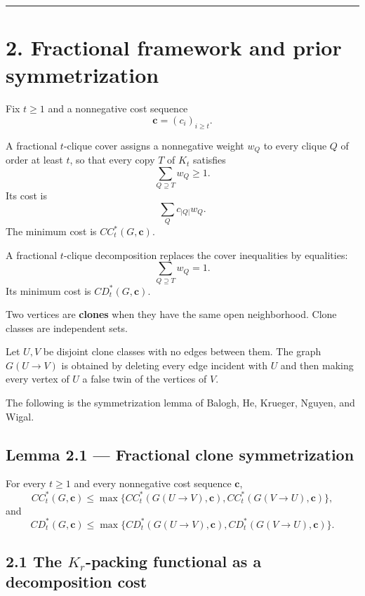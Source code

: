 \documentclass[11pt,a4paper]{article}
\begin{document}
\begin{center}\rule{0.5\linewidth}{0.5pt}\end{center}

\section{2. Fractional framework and prior symmetrization}\label{fractional-framework-and-prior-symmetrization}

Fix \(t\ge1\) and a nonnegative cost sequence
\[
\mathbf c=(c_i)_{i\ge t}.
\]

A fractional \(t\)-clique cover assigns a nonnegative weight \(w_Q\) to
every clique \(Q\) of order at least \(t\), so that every copy \(T\) of
\(K_t\) satisfies
\[
\sum_{Q\supseteq T}w_Q\ge1.
\]
Its cost is
\[
\sum_Qc_{|Q|}w_Q.
\]
The minimum cost is \(CC_t^*(G,\mathbf c)\).

A fractional \(t\)-clique decomposition replaces the cover inequalities by
equalities:
\[
\sum_{Q\supseteq T}w_Q=1.
\]
Its minimum cost is \(CD_t^*(G,\mathbf c)\).

Two vertices are \textbf{clones} when they have the same open neighborhood. Clone
classes are independent sets.

Let \(U,V\) be disjoint clone classes with no edges between them.
The graph \(G(U\to V)\) is obtained by deleting every edge incident with
\(U\) and then making every vertex of \(U\) a false twin of the vertices of
\(V\).

The following is the symmetrization lemma of Balogh, He, Krueger, Nguyen,
and Wigal.

\subsection{Lemma 2.1 --- Fractional clone symmetrization}\label{lemma-2.1-fractional-clone-symmetrization}

For every \(t\ge1\) and every nonnegative cost sequence \(\mathbf c\),
\[
CC_t^*(G,\mathbf c)
\le
\max\{
CC_t^*(G(U\to V),\mathbf c),
CC_t^*(G(V\to U),\mathbf c)
\},
\tag{2.1}
\]
and
\[
CD_t^*(G,\mathbf c)
\le
\max\{
CD_t^*(G(U\to V),\mathbf c),
CD_t^*(G(V\to U),\mathbf c)
\}.
\tag{2.2}
\]

\subsection{\texorpdfstring{2.1 The \(K_r\)-packing functional as a decomposition cost}{2.1 The K\_r-packing functional as a decomposition cost}}\label{the-k_r-packing-functional-as-a-decomposition-cost}
\end{document}
